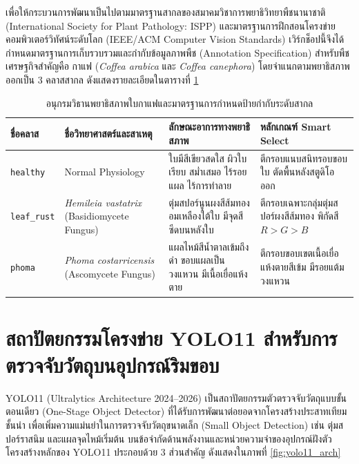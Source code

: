เพื่อให้กระบวนการพัฒนาเป็นไปตามมาตรฐานสากลของสมาคมวิชาการพยาธิวิทยาพืชนานาชาติ (International Society for Plant Pathology: ISPP) และมาตรฐานการฝึกสอนโครงข่ายคอมพิวเตอร์วิทัศน์ระดับโลก (IEEE/ACM Computer Vision Standards) เวิร์กช็อปนี้จึงได้กำหนดมาตรฐานการเก็บรวบรวมและกำกับข้อมูลภาพพืช (Annotation Specification) สำหรับพืชเศรษฐกิจสำคัญคือ กาแฟ (\textit{Coffea arabica} และ \textit{Coffea canephora}) โดยจำแนกตามพยาธิสภาพออกเป็น 3 คลาสสากล ดังแสดงรายละเอียดใน\mbox{ตารางที่} \ref{tab:coffee_pathology_taxonomy}

\begin{table}[H]
\centering
\small
\caption{อนุกรมวิธานพยาธิสภาพใบกาแฟและมาตรฐานการกำหนดป้ายกำกับระดับสากล}
\label{tab:coffee_pathology_taxonomy}
\begin{tabularx}{\textwidth}{p{2.2cm}p{3.0cm}p{4.2cm}X}
\toprule
\textbf{ชื่อคลาส} & \textbf{ชื่อวิทยาศาสตร์และสาเหตุ} & \textbf{ลักษณะอาการทางพยาธิสภาพ} & \textbf{หลักเกณฑ์ Smart Select} \\
\midrule
\texttt{healthy} & Normal Physiology & ใบมีสีเขียวสดใส ผิวใบเรียบ สม่ำเสมอ ไร้รอยแผล ไร้การทำลาย & ตีกรอบแนบสนิทรอบขอบใบ ตัดพื้นหลังสตูดิโอออก \\
\texttt{leaf\_rust} & \textit{Hemileia vastatrix} (Basidiomycete Fungus) & ตุ่มสปอร์นูนผงสีส้มทองอมเหลืองใต้ใบ มีจุดสีซีดบนหลังใบ & ตีกรอบเฉพาะกลุ่มตุ่มสปอร์ผงสีส้มทอง พิกัดสี $R>G>B$ \\
\texttt{phoma} & \textit{Phoma costarricensis} (Ascomycete Fungus) & แผลไหม้สีน้ำตาลเข้มถึงดำ ขอบแผลเป็นวงแหวน มีเนื้อเยื่อแห้งตาย & ตีกรอบขอบเขตเนื้อเยื่อแห้งตายสีเข้ม มีรอยแต้มวงแหวน \\
\bottomrule
\end{tabularx}
\end{table}

\section{สถาปัตยกรรมโครงข่าย YOLO11 สำหรับการตรวจจับวัตถุบนอุปกรณ์ริมขอบ}

YOLO11 (Ultralytics Architecture 2024--2026) เป็นสถาปัตยกรรมตัวตรวจจับวัตถุแบบขั้นตอนเดียว (One-Stage Object Detector) ที่ได้รับการพัฒนาต่อยอดจากโครงสร้างประสาทเทียมชั้นนำ เพื่อเพิ่มความแม่นยำในการตรวจจับวัตถุขนาดเล็ก (Small Object Detection) เช่น ตุ่มสปอร์ราสนิม และแผลจุดไหม้เริ่มต้น บนข้อจำกัดด้านพลังงานและหน่วยความจำของอุปกรณ์ฝังตัว โครงสร้างหลักของ YOLO11 ประกอบด้วย 3 ส่วนสำคัญ ดังแสดงใน\mbox{ภาพที่} \ref{fig:yolo11_arch}

